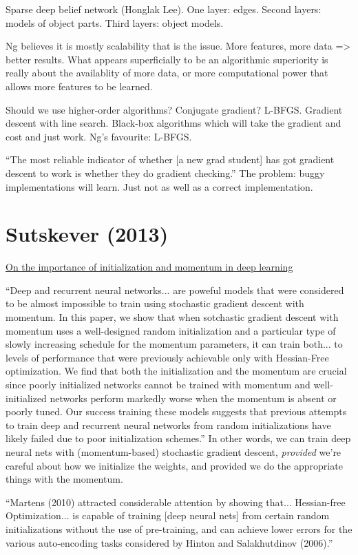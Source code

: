 \documentclass[12pt]{report}
\newcommand{\link}[2]{\href{#1}{#2}}
\begin{document}
Sparse deep belief network (Honglak Lee).  One layer: edges.  Second
layers: models of object parts.  Third layers: object models.  

Ng believes it is mostly scalability that is the issue.  More
features, more data => better results.  What appears superficially to
be an algorithmic superiority is really about the availablity of more
data, or more computational power that allows more features to be
learned.

Should we use higher-order algorithms?  Conjugate gradient?  L-BFGS.
Gradient descent with line search.  Black-box algorithms which will
take the gradient and cost and just work.  Ng's favourite: L-BFGS.

``The most reliable indicator of whether [a new grad student] has got
gradient descent to work is whether they do gradient checking.''  The
problem: buggy implementations will learn.  Just not as well as a
correct implementation.

\section{Sutskever (2013)}

\link{http://www.cs.utoronto.ca/\~ilya/pubs/2013/1051_2.pdf}{On the
  importance of initialization and momentum in deep learning}

``Deep and recurrent neural networks... are poweful models that were
considered to be almost impossible to train using stochastic gradient
descent with momentum.  In this paper, we show that when sotchastic
gradient descent with momentum uses a well-designed random
initialization and a particular type of slowly increasing schedule for
the momentum parameters, it can train both... to levels of performance
that were previously achievable only with Hessian-Free optimization.
We find that both the initialization and the momentum are crucial
since poorly initialized networks cannot be trained with momentum and
well-initialized networks perform markedly worse when the momentum is
absent or poorly tuned.  Our success training these models suggests
that previous attempts to train deep and recurrent neural networks
from random initializations have likely failed due to poor
initialization schemes.''  In other words, we can train deep neural
nets with (momentum-based) stochastic gradient descent,
\emph{provided} we're careful about how we initialize the weights, and
provided we do the appropriate things with the momentum.

``Martens (2010) attracted considerable attention by showing
that... Hessian-free Optimization... is capable of training [deep
neural nets] from certain random initializations without the use of
pre-training, and can achieve lower errors for the various
auto-encoding tasks considered by Hinton and Salakhutdinov (2006).''
\end{document}
